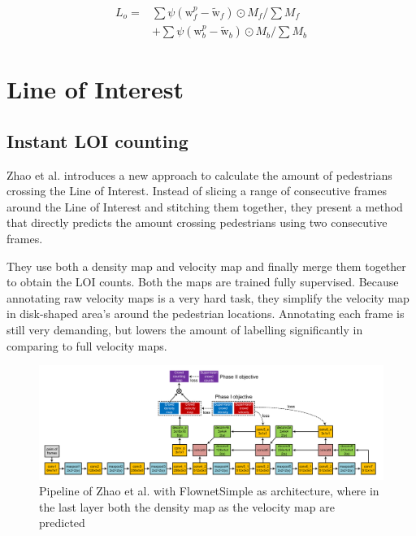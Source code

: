 \begin{equation}
\begin{aligned}
L_{o}=&\sum \psi\left(\mathrm{w}_{f}^{p}-\widetilde{\mathrm{w}}_{f}\right) \odot M_{f} / \sum M_{f} \\
&+\sum \psi\left(\mathrm{w}_{b}^{p}-\widetilde{\mathrm{w}}_{b}\right) \odot M_{b} / \sum M_{b}
\end{aligned}
\label{eq:student_pm_loss}
\end{equation}

\section{Line of Interest}

\subsection{Instant LOI counting}
\label{section:crossing_line_2016}
Zhao et al. \cite{leibe_crossing-line_2016} introduces a new approach to calculate the amount of pedestrians crossing the Line of Interest. Instead of slicing a range of consecutive frames around the Line of Interest and stitching them together, they present a method that directly predicts the amount crossing pedestrians using two consecutive frames.

They use both a density map and velocity map and finally merge them together to obtain the LOI counts. Both the maps are trained fully supervised. Because annotating raw velocity maps is a very hard task, they simplify the velocity map in disk-shaped area's around the pedestrian locations. Annotating each frame is still very demanding, but lowers the amount of labelling significantly in comparing to full velocity maps.

\begin{figure}[h]
\centering
\includegraphics[width=1.0\textwidth]{images/zhao16_model}
\caption{Pipeline of Zhao et al. with FlownetSimple as architecture, where in the last layer both the density map as the velocity map are predicted}
\label{fig:zhao_model}
\end{figure}


